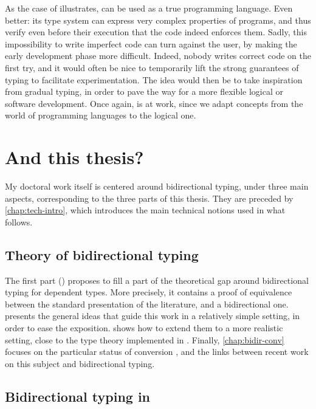 As the case of  illustrates,  can be used as a true programming language.
Even better: its type system can express very complex properties of programs, and thus
verify even before their execution that the code indeed enforces them.
Sadly, this impossibility to write imperfect code can turn against the user, by making the
early development phase more difficult. Indeed, nobody writes correct code on the first try,
and it would often be nice to temporarily lift the strong guarantees of typing to
facilitate experimentation. The idea would then be to take inspiration from gradual typing,
in order to pave the way for a more flexible logical or software development. Once again,
 is at work, since we adapt concepts from the world of
programming languages to the logical one.

\section{And this thesis?}
\label{sec:this-thesis}

My doctoral work itself is centered around bidirectional typing, under three main aspects,
corresponding to the three parts of this thesis.
They are preceded by \cref{chap:tech-intro}, which introduces the main technical notions
used in what follows.

\subsection{Theory of bidirectional typing}

The first part () proposes to fill a part of the theoretical gap around
bidirectional typing for dependent types. More precisely, it contains a proof of equivalence
between the standard presentation of the literature, and a bidirectional one.
 presents the general ideas that guide this work in a relatively
simple setting, in order to ease the exposition.  shows how to extend
them to a more realistic setting, close to the type theory implemented in .
Finally, \cref{chap:bidir-conv} focuses on the particular status of conversion%
,
and the links between recent work on this subject and bidirectional typing.

\subsection{Bidirectional typing in }

